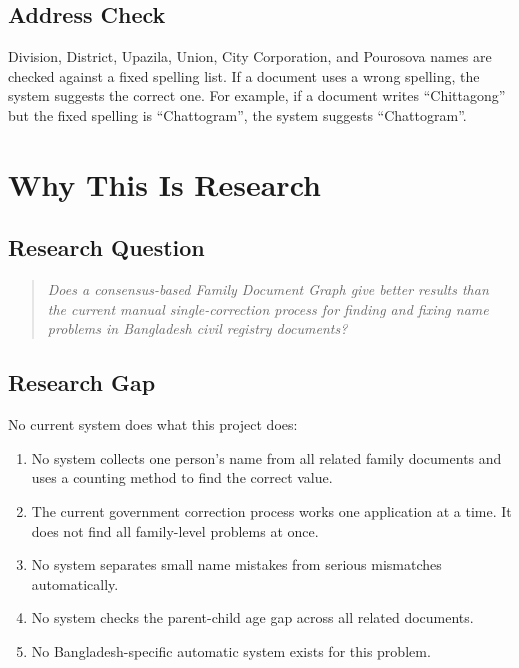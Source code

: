 \documentclass[12pt, a4paper]{article}
\begin{document}
\subsection{Address Check}

Division, District, Upazila, Union, City Corporation, and Pourosova names
are checked against a fixed spelling list. If a document uses a wrong
spelling, the system suggests the correct one. For example, if a document
writes ``Chittagong'' but the fixed spelling is ``Chattogram'', the system
suggests ``Chattogram''.

\section{Why This Is Research}

\subsection{Research Question}

\begin{quote}
\textit{Does a consensus-based Family Document Graph give better results
than the current manual single-correction process for finding and fixing
name problems in Bangladesh civil registry documents?}
\end{quote}

\subsection{Research Gap}

No current system does what this project does:

\begin{enumerate}
    \item No system collects one person's name from all related family
          documents and uses a counting method to find the correct value.
    \item The current government correction process works one application
          at a time. It does not find all family-level problems at once.
    \item No system separates small name mistakes from serious mismatches
          automatically.
    \item No system checks the parent-child age gap across all related documents.
    \item No Bangladesh-specific automatic system exists for this problem.
\end{enumerate}
\end{document}
